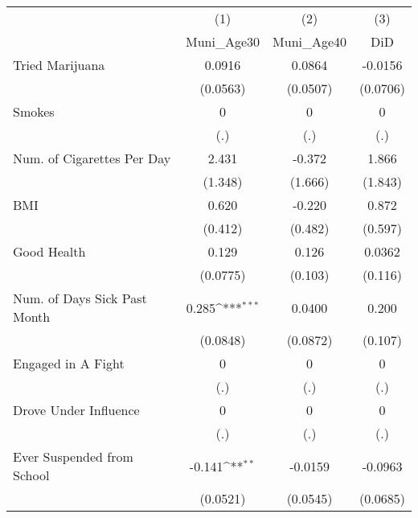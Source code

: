 {
\def\sym#1{\ifmmode^{#1}\else\(^{#1}\)\fi}
\begin{tabular}{l*{3}{c}}
\hline\hline
            &\multicolumn{1}{c}{(1)}&\multicolumn{1}{c}{(2)}&\multicolumn{1}{c}{(3)}\\
            &\multicolumn{1}{c}{Muni\_Age30}&\multicolumn{1}{c}{Muni\_Age40}&\multicolumn{1}{c}{DiD}\\
\hline
Tried Marijuana&      0.0916         &      0.0864         &     -0.0156         \\
            &    (0.0563)         &    (0.0507)         &    (0.0706)         \\
[1em]
Smokes      &           0         &           0         &           0         \\
            &         (.)         &         (.)         &         (.)         \\
[1em]
Num. of Cigarettes Per Day&       2.431         &      -0.372         &       1.866         \\
            &     (1.348)         &     (1.666)         &     (1.843)         \\
[1em]
BMI         &       0.620         &      -0.220         &       0.872         \\
            &     (0.412)         &     (0.482)         &     (0.597)         \\
[1em]
Good Health &       0.129         &       0.126         &      0.0362         \\
            &    (0.0775)         &     (0.103)         &     (0.116)         \\
[1em]
Num. of Days Sick Past Month&       0.285\sym{***}&      0.0400         &       0.200         \\
            &    (0.0848)         &    (0.0872)         &     (0.107)         \\
[1em]
Engaged in A Fight&           0         &           0         &           0         \\
            &         (.)         &         (.)         &         (.)         \\
[1em]
Drove Under Influence&           0         &           0         &           0         \\
            &         (.)         &         (.)         &         (.)         \\
[1em]
Ever Suspended from School&      -0.141\sym{**} &     -0.0159         &     -0.0963         \\
            &    (0.0521)         &    (0.0545)         &    (0.0685)         \\

\end{tabular}}
